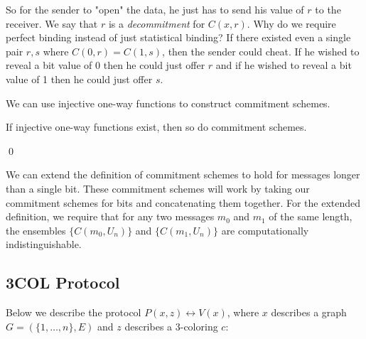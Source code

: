\documentclass[12pt]{tufte-book}
\begin{document}
So for the sender to "open" the data, he just has to send his value of $r$ to the receiver. We say that $r$ is a \emph{decommitment} for $C(x,r)$. Why do we require perfect binding instead of just statistical binding? If there existed even a single pair $r, s$ where $C(0,r) = C(1,s)$, then the sender could cheat. If he wished to reveal a bit value of 0 then he could just offer $r$ and if he wished to reveal a bit value of 1 then he could just offer $s$.

We can use injective one-way functions to construct commitment schemes.

\begin{theorem}
If injective one-way functions exist, then so do commitment schemes.
\end{theorem}
\qed

\medskip
We can extend the definition of commitment schemes to hold for messages longer than a single bit. These commitment schemes will work by taking our commitment schemes for bits and concatenating them together. For the extended definition, we require that for any two messages $m_0$ and $m_1$ of the same length, the ensembles $\{ C(m_0, U_n) \}$ and $\{ C(m_1, U_n) \}$ are computationally indistinguishable.

\subsection{3COL Protocol}

Below we describe the protocol $P(x,z) \leftrightarrow V(x)$, where $x$ describes a graph $G = (\{1, \ldots, n \}, E)$ and $z$ describes a 3-coloring $c$:
\end{document}
